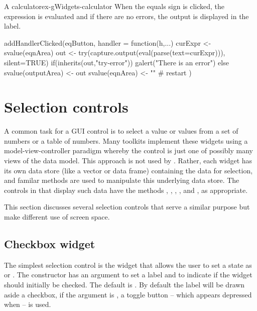 \begin{example}{A calculator}{ex-gWidgets-calculator}
When the equals sign is clicked, the expression is evaluated and if
there are no errors, the output is displayed in the label.
\begin{Schunk}
\begin{Sinput}
 addHandlerClicked(eqButton, handler = function(h,...) {
   curExpr <- svalue(eqnArea)
   out <- try(capture.output(eval(parse(text=curExpr))), silent=TRUE)
   if(inherits(out,"try-error")) {
     galert("There is an error")
   } else {
     svalue(outputArea) <- out
     svalue(eqnArea) <- ""            # restart
   }
 })
\end{Sinput}
\end{Schunk}

\end{example}

\section{Selection controls}
\label{sec:gWidgets-widg-select-data}

A common task for a GUI control is to select a value or values from a
set of numbers or a table of numbers. Many toolkits implement these
widgets using a model-view-controller paradigm whereby the control is
just one of possibly many views of the data model. This
approach is not used by . Rather, each widget has its
own data store (like a vector or data frame)
containing the data for selection, and familar \R\/ methods are used to
manipulate this underlying data store. The controls in  that
display such data have the methods \code{[}, \code{[\ASSIGN},
, ,  and , as
appropriate.

This section discusses several selection controls that serve a similar
purpose but make different use of screen space.

\subsection{Checkbox widget}
\label{sec:gWidgets-checkbox-widget}

The simplest selection control is the  widget
that allows the user to set a state as  or
. The constructor has an argument
 to set a label and
 to indicate if the widget should
initially be checked. The default is . By default the label
will be drawn aside a checkbox, if the argument
 is , a toggle button
-- which appears depressed when  -- is used.

